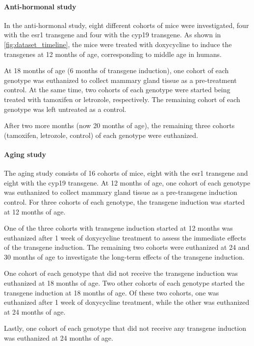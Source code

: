 \paragraph{Anti-hormonal study}
In the anti-hormonal study, eight different cohorts of mice were investigated,
four with the \gls{esr1} transgene and four with the \gls{cyp19} transgene.
As shown in \cref{fig:dataset_timeline}, the mice were treated with doxycycline
to induce the transgenes at 12 months of age, corresponding to middle age in
humans.

At 18 months of age (6 months of transgene induction), one cohort of each
genotype was euthanized to collect mammary gland tissue as a pre-treatment
control.
At the same time, two cohorts of each genotype were started being treated with
tamoxifen or letrozole, respectively.
The remaining cohort of each genotype was left untreated as a control.

After two more months (now 20 months of age), the remaining three cohorts
(tamoxifen, letrozole, control) of each genotype were
euthanized\supercite{furth_esr1_2023}.

\paragraph{Aging study}
The aging study consists of 16 cohorts of mice, eight with the \gls{esr1}
transgene and eight with the \gls{cyp19} transgene.
At 12 months of age, one cohort of each genotype was euthanized to collect
mammary gland tissue as a pre-transgene induction control.
For three cohorts of each genotype, the transgene induction was started at 12
months of age.

One of the three cohorts with transgene induction started at 12 months was
euthanized after 1 week of doxycycline treatment to assess the immediate
effects of the transgene induction.
The remaining two cohorts were euthanized at 24 and 30 months of age to
investigate the long-term effects of the transgene induction.

One cohort of each genotype that did not receive the transgene induction was
euthanized at 18 months of age.
Two other cohorts of each genotype started the transgene induction at 18 months
of age.
Of these two cohorts, one was euthanized after 1 week of doxycycline treatment,
while the other was euthanized at 24 months of age.

Lastly, one cohort of each genotype that did not receive any transgene
induction was euthanized at 24 months of
age\supercite{furth_overexpression_2023}.

